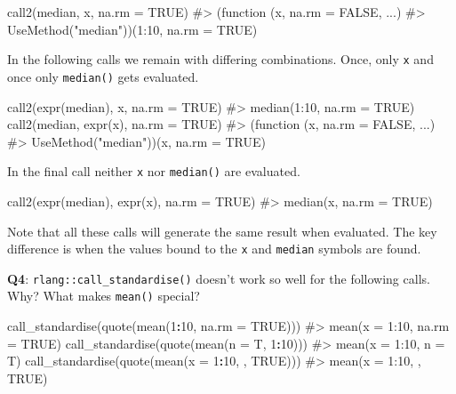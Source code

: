 \documentclass[
]{krantz}
\makeatletter
\newenvironment{Shaded}{\begin{snugshade}}{\end{snugshade}}
\newcommand{\CommentTok}[1]{\textcolor[rgb]{0.56,0.35,0.01}{\textit{#1}}}
\newcommand{\DataTypeTok}[1]{\textcolor[rgb]{0.13,0.29,0.53}{#1}}
\newcommand{\DecValTok}[1]{\textcolor[rgb]{0.00,0.00,0.81}{#1}}
\newcommand{\KeywordTok}[1]{\textcolor[rgb]{0.13,0.29,0.53}{\textbf{#1}}}
\newcommand{\NormalTok}[1]{#1}
\newcommand{\OperatorTok}[1]{\textcolor[rgb]{0.81,0.36,0.00}{\textbf{#1}}}
\newcommand{\OtherTok}[1]{\textcolor[rgb]{0.56,0.35,0.01}{#1}}
\newenvironment{kframe}{%
\medskip{}
\setlength{\fboxsep}{.8em}
 \def\at@end@of@kframe{}%
 \ifinner\ifhmode%
  \def\at@end@of@kframe{\end{minipage}}%
  \begin{minipage}{\columnwidth}%
 \fi\fi%
 \def\FrameCommand##1{\hskip\@totalleftmargin \hskip-\fboxsep
 \colorbox{shadecolor}{##1}\hskip-\fboxsep
     \hskip-\linewidth \hskip-\@totalleftmargin \hskip\columnwidth}%
 \MakeFramed {\advance\hsize-\width
   \@totalleftmargin\z@ \linewidth\hsize
   \@setminipage}}%
 {\par\unskip\endMakeFramed%
 \at@end@of@kframe}
\renewenvironment{Shaded}{\begin{kframe}}{\end{kframe}}
\renewcommand{\KeywordTok} [1]{\textcolor[rgb]{0.00,0.44,0.13}{{#1}}}
\renewcommand{\DataTypeTok}[1]{\textcolor[rgb]{0.56,0.13,0.00}{{#1}}}
\renewcommand{\DecValTok}  [1]{\textcolor[rgb]{0.25,0.63,0.44}{{#1}}}
\renewcommand{\CommentTok} [1]{\textcolor[rgb]{0.38,0.63,0.69}{{#1}}}
\renewcommand{\OtherTok}   [1]{\textcolor[rgb]{0.00,0.44,0.13}{{#1}}}
\renewcommand{\NormalTok}  [1]{{#1}}
\makeatother
\begin{document}
\begin{Shaded}
\begin{Highlighting}[]
\KeywordTok{call2}\NormalTok{(median, x, }\DataTypeTok{na.rm =} \OtherTok{TRUE}\NormalTok{)}
\CommentTok{#> (function (x, na.rm = FALSE, ...) }
\CommentTok{#> UseMethod("median"))(1:10, na.rm = TRUE)}
\end{Highlighting}
\end{Shaded}

In the following calls we remain with differing combinations. Once, only \texttt{x} and once only \texttt{median()} gets evaluated.

\begin{Shaded}
\begin{Highlighting}[]
\KeywordTok{call2}\NormalTok{(}\KeywordTok{expr}\NormalTok{(median), x, }\DataTypeTok{na.rm =} \OtherTok{TRUE}\NormalTok{)}
\CommentTok{#> median(1:10, na.rm = TRUE)}
\KeywordTok{call2}\NormalTok{(median, }\KeywordTok{expr}\NormalTok{(x), }\DataTypeTok{na.rm =} \OtherTok{TRUE}\NormalTok{)}
\CommentTok{#> (function (x, na.rm = FALSE, ...) }
\CommentTok{#> UseMethod("median"))(x, na.rm = TRUE)}
\end{Highlighting}
\end{Shaded}

In the final call neither \texttt{x} nor \texttt{median()} are evaluated.

\begin{Shaded}
\begin{Highlighting}[]
\KeywordTok{call2}\NormalTok{(}\KeywordTok{expr}\NormalTok{(median), }\KeywordTok{expr}\NormalTok{(x), }\DataTypeTok{na.rm =} \OtherTok{TRUE}\NormalTok{)}
\CommentTok{#> median(x, na.rm = TRUE)}
\end{Highlighting}
\end{Shaded}

Note that all these calls will generate the same result when evaluated. The key difference is when the values bound to the \texttt{x} and \texttt{median} symbols are found.

\textbf{{Q4}}: \texttt{rlang::call\_standardise()} doesn't work so well for the following calls.
Why? What makes \texttt{mean()} special?

\begin{Shaded}
\begin{Highlighting}[]
\KeywordTok{call_standardise}\NormalTok{(}\KeywordTok{quote}\NormalTok{(}\KeywordTok{mean}\NormalTok{(}\DecValTok{1}\OperatorTok{:}\DecValTok{10}\NormalTok{, }\DataTypeTok{na.rm =} \OtherTok{TRUE}\NormalTok{)))}
\CommentTok{#> mean(x = 1:10, na.rm = TRUE)}
\KeywordTok{call_standardise}\NormalTok{(}\KeywordTok{quote}\NormalTok{(}\KeywordTok{mean}\NormalTok{(}\DataTypeTok{n =}\NormalTok{ T, }\DecValTok{1}\OperatorTok{:}\DecValTok{10}\NormalTok{)))}
\CommentTok{#> mean(x = 1:10, n = T)}
\KeywordTok{call_standardise}\NormalTok{(}\KeywordTok{quote}\NormalTok{(}\KeywordTok{mean}\NormalTok{(}\DataTypeTok{x =} \DecValTok{1}\OperatorTok{:}\DecValTok{10}\NormalTok{, , }\OtherTok{TRUE}\NormalTok{)))}
\CommentTok{#> mean(x = 1:10, , TRUE)}
\end{Highlighting}
\end{Shaded}
\end{document}
